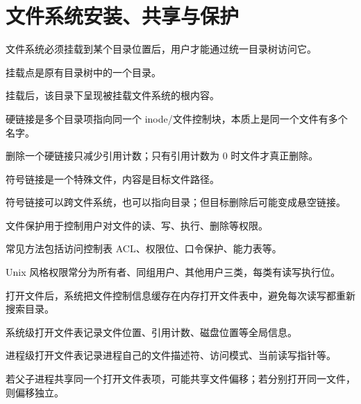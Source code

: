 \section{文件系统安装、共享与保护}
\begin{points}
  \item 文件系统必须挂载到某个目录位置后，用户才能通过统一目录树访问它。
  \item 挂载点是原有目录树中的一个目录。
  \item 挂载后，该目录下呈现被挂载文件系统的根内容。
\end{points}


\begin{points}
  \item 硬链接是多个目录项指向同一个 inode/文件控制块，本质上是同一个文件有多个名字。
  \item 删除一个硬链接只减少引用计数；只有引用计数为 0 时文件才真正删除。
  \item 符号链接是一个特殊文件，内容是目标文件路径。
  \item 符号链接可以跨文件系统，也可以指向目录；但目标删除后可能变成悬空链接。
\end{points}


\begin{points}
  \item 文件保护用于控制用户对文件的读、写、执行、删除等权限。
  \item 常见方法包括访问控制表 ACL、权限位、口令保护、能力表等。
  \item Unix 风格权限常分为所有者、同组用户、其他用户三类，每类有读写执行位。
\end{points}


\begin{points}
  \item 打开文件后，系统把文件控制信息缓存在内存打开文件表中，避免每次读写都重新搜索目录。
  \item 系统级打开文件表记录文件位置、引用计数、磁盘位置等全局信息。
  \item 进程级打开文件表记录进程自己的文件描述符、访问模式、当前读写指针等。
  \item 若父子进程共享同一个打开文件表项，可能共享文件偏移；若分别打开同一文件，则偏移独立。
\end{points}


